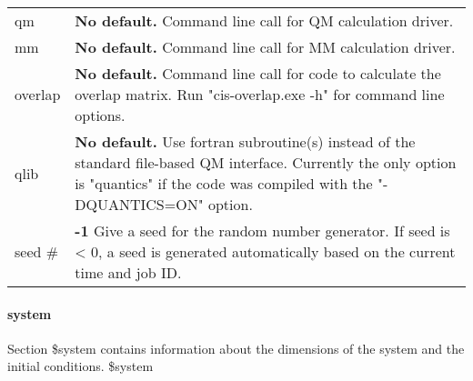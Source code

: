 \documentclass{report}
\begin{document}
\begin{tabularx}{\textwidth}{ m{2.5cm} X }
qm				&
	\textbf{No default.} \newline
	Command line call for QM calculation driver.  \\

mm				&
	\textbf{No default.} \newline
	Command line call for MM calculation driver.  \\

overlap &
    	\textbf{No default.} \newline
	Command line call for code to calculate the overlap matrix. Run "cis-overlap.exe -h" for command line options. \\

qlib &
    \textbf{No default.} \newline
    Use fortran subroutine(s) instead of the standard file-based QM interface. Currently the only option is "quantics" if the code
    was compiled with the "-DQUANTICS=ON" option. \\

seed \# &
	\textbf{-1} \newline
	Give a seed for the random number generator. If seed is < 0, a seed is generated automatically based on the current time and job ID. \\
\end{tabularx}

\paragraph{system}
Section \$system contains information about the dimensions of the system and the initial conditions. \newline
\$system
\end{document}

